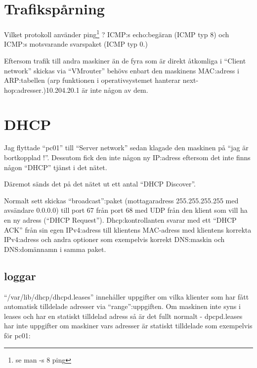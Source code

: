 \documentclass[swedish,10pt,a4paper]{article}
\begin{document}
\section{Trafikspårning}
\label{sec:wireshark_usage}

Vilket protokoll använder ping\footnote{se man -s 8 ping} ? ICMP:s echo:begäran (ICMP typ 8) och ICMP:s motsvarande svarspaket (ICMP typ 0.)

Eftersom trafik till andra maskiner än de fyra som är direkt åtkomliga i ``Client network'' skickas via
``VMrouter'' behövs enbart den maskinens MAC:adress i ARP:tabellen (arp funktionen i operativsystemet hanterar
next-hop:adresser.)\@10.204.20.1 är inte någon av dem.

\section{DHCP}
\label{sec:dhcp_konf}

Jag flyttade ``pc01'' till  ``Server network'' sedan klagade den maskinen på ``jag är bortkopplad !''.
Dessutom fick den inte någon ny IP:adress eftersom det inte finns någon ``DHCP'' tjänst i det nätet.

Däremot sänds det på det nätet ut ett antal ``DHCP Discover''.

Normalt sett skickas ``broadcast'':paket (mottagaradress 255.255.255.255 med avsändare 0.0.0.0) till port 67 från port 68 med UDP från
den klient som vill ha en ny adress (``DHCP Request''). Dhcp:kontrollanten svarar med ett ``DHCP ACK'' från sin
egen IPv4:adress till klientens MAC-adress med klientens korrekta IPv4:adress och andra optioner som exempelvis
korrekt DNS:maskin och DNS:domännamn i samma paket.

\subsection{loggar}

``/var/lib/dhcp/dhcpd.leases'' innehåller uppgifter om vilka klienter som har fått
automatisk tilldelade adresser via ``range'':uppgiften. Om maskinen inte syns i leases och
har en statiskt tilldelad adress så är det fullt normalt - dpcpd.leases har inte
uppgifter om maskiner vars adresser är statiskt tilldelade
som exempelvis för pc01:


\end{document}
